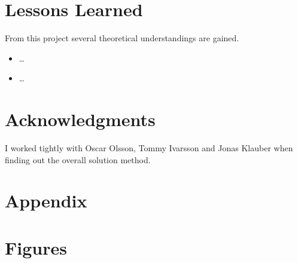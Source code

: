 \documentclass[10pt, a4paper]{article}
\begin{document}
\section{Lessons Learned}
From this project several theoretical understandings are gained.
\begin{itemize}
	\item \ldots
\end{itemize}

\begin{itemize}
	\item \ldots
\end{itemize}


\section{Acknowledgments}

I worked tightly with Oscar Olsson, Tommy Ivarsson and Jonas Klauber when finding out the overall solution method.

{}


\newpage
\section*{Appendix}
\appendix
\section{Figures} \label{appendix:figures}
\end{document}
